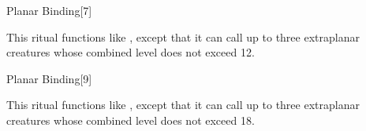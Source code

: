 \begin{spellsection}{Planar Binding}[7]
    \begin{spellheader}
    \end{spellheader}
    \begin{spellcontent}
        \begin{spelltargetinginfo}
        \end{spelltargetinginfo}
        \begin{spelleffects}

            \spellspecial This ritual functions like , except that it can call up to three extraplanar creatures whose combined level does not exceed 12.
        \end{spelleffects}
    \end{spellcontent}
    \begin{spellfooter}
    \end{spellfooter}
\end{spellsection}

\begin{spellsection}[Greater]{Planar Binding}[9]
    \begin{spellheader}
    \end{spellheader}
    \begin{spellcontent}
        \begin{spelltargetinginfo}
        \end{spelltargetinginfo}
        \begin{spelleffects}

            \spellspecial This ritual functions like , except that it can call up to three extraplanar creatures whose combined level does not exceed 18.
        \end{spelleffects}
    \end{spellcontent}
    \begin{spellfooter}
    \end{spellfooter}
\end{spellsection}

